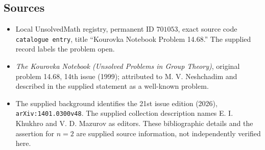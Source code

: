 \documentclass[11pt]{article}
\begin{document}
\subsection{Sources}
\begin{itemize}
\item Local UnsolvedMath registry, permanent ID \(701053\), exact source code \texttt{catalogue entry}, title ``Kourovka Notebook Problem 14.68.'' The supplied record labels the problem open.
\item \emph{The Kourovka Notebook (Unsolved Problems in Group Theory)}, original problem 14.68, 14th issue (1999); attributed to M. V. Neshchadim and described in the supplied statement as a well-known problem.
\item The supplied background identifies the 21st issue edition (2026), \texttt{arXiv:1401.0300v48}. The supplied collection description names E. I. Khukhro and V. D. Mazurov as editors. These bibliographic details and the assertion for \(n=2\) are supplied source information, not independently verified here.
\end{itemize}
\end{document}
